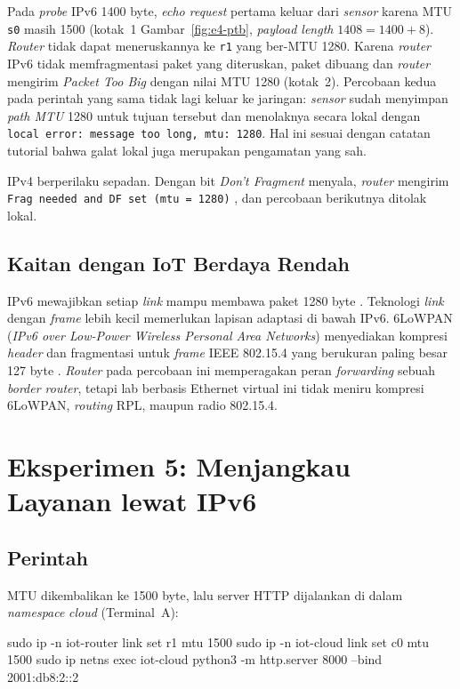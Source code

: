 \documentclass[12pt,a4paper]{report}
\newcommand{\kode}[1]{\texttt{\small #1}}
\begin{document}
Pada \emph{probe} IPv6 1400 byte, \emph{echo request} pertama keluar dari \emph{sensor} karena MTU \kode{s0} masih 1500 (kotak~1 Gambar~\ref{fig:e4-ptb}, \emph{payload length} $1408 = 1400 + 8$). \emph{Router} tidak dapat meneruskannya ke \kode{r1} yang ber-MTU 1280. Karena \emph{router} IPv6 tidak memfragmentasi paket yang diteruskan, paket dibuang dan \emph{router} mengirim \emph{Packet Too Big} dengan nilai MTU 1280 (kotak~2). Percobaan kedua pada perintah yang sama tidak lagi keluar ke jaringan: \emph{sensor} sudah menyimpan \emph{path MTU} 1280 untuk tujuan tersebut dan menolaknya secara lokal dengan \kode{local error: message too long, mtu: 1280}. Hal ini sesuai dengan catatan tutorial bahwa galat lokal juga merupakan pengamatan yang sah.

IPv4 berperilaku sepadan. Dengan bit \emph{Don't Fragment} menyala, \emph{router} mengirim \kode{Frag needed and DF set (mtu = 1280)} \cite{rfc1191}, dan percobaan berikutnya ditolak lokal.

\subsection{Kaitan dengan IoT Berdaya Rendah}
IPv6 mewajibkan setiap \emph{link} mampu membawa paket 1280 byte \cite{rfc8200}. Teknologi \emph{link} dengan \emph{frame} lebih kecil memerlukan lapisan adaptasi di bawah IPv6. 6LoWPAN (\emph{IPv6 over Low-Power Wireless Personal Area Networks}) menyediakan kompresi \emph{header} dan fragmentasi untuk \emph{frame} IEEE 802.15.4 yang berukuran paling besar 127 byte \cite{rfc4944}. \emph{Router} pada percobaan ini memperagakan peran \emph{forwarding} sebuah \emph{border router}, tetapi lab berbasis Ethernet virtual ini tidak meniru kompresi 6LoWPAN, \emph{routing} RPL, maupun radio 802.15.4.

\section{Eksperimen 5: Menjangkau Layanan lewat IPv6}

\subsection{Perintah}
MTU dikembalikan ke 1500 byte, lalu server HTTP dijalankan di dalam \emph{namespace} \emph{cloud} (Terminal~A):
\begin{cmd}
sudo ip -n iot-router link set r1 mtu 1500
sudo ip -n iot-cloud link set c0 mtu 1500
sudo ip netns exec iot-cloud python3 -m http.server 8000 --bind 2001:db8:2::2
\end{cmd}
\end{document}
